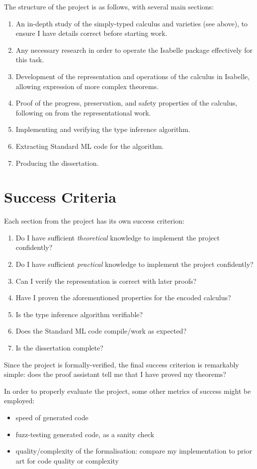 \documentclass[12pt]{article}
\begin{document}
The structure of the project is as follows, with several main sections:
\begin{enumerate}
\item
An in-depth study of the simply-typed calculus and varieties (see above), to ensure I have details correct before starting work.
\item
Any necessary research in order to operate the Isabelle package effectively for this task.
\item
Development of the representation and operations of the calculus in Isabelle, allowing expression of more complex theorems.
\item
Proof of the progress, preservation, and safety properties of the calculus, following on from the representational work.
\item
Implementing and verifying the type inference algorithm.
\item
Extracting Standard ML code for the algorithm.
\item
Producing the dissertation.
\end{enumerate}

\section*{Success Criteria}
Each section from the project has its own success criterion:
\begin{enumerate}
\item
Do I have sufficient \emph{theoretical} knowledge to implement the project confidently?
\item
Do I have sufficient \emph{practical} knowledge to implement the project confidently?
\item
Can I verify the representation is correct with later proofs?
\item
Have I proven the aforementioned properties for the encoded calculus?
\item
Is the type inference algorithm verifiable?
\item
Does the Standard ML code compile/work as expected?
\item
Is the dissertation complete?
\end{enumerate}
Since the project is formally-verified, the final success criterion is remarkably simple: does the proof assistant tell me that I have proved my theorems?

In order to properly evaluate the project, some other metrics of success might be employed:
\begin{itemize}
\item
speed of generated code
\item
fuzz-testing generated code, as a sanity check
\item
quality/complexity of the formalisation: compare my implementation to prior art for code quality or complexity
\end{itemize}
\end{document}

